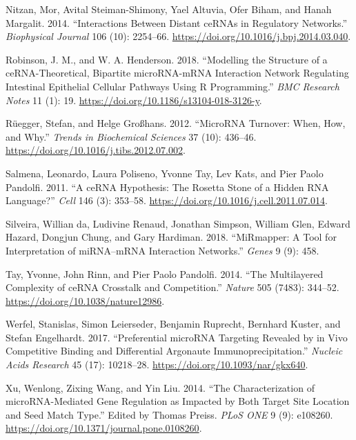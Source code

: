 \documentclass[]{article}
\begin{document}
\leavevmode\hypertarget{ref-nitzan_interactions_2014}{}%
Nitzan, Mor, Avital Steiman-Shimony, Yael Altuvia, Ofer Biham, and Hanah
Margalit. 2014. ``Interactions Between Distant ceRNAs in Regulatory
Networks.'' \emph{Biophysical Journal} 106 (10): 2254--66.
\url{https://doi.org/10.1016/j.bpj.2014.03.040}.

\leavevmode\hypertarget{ref-robinson_modelling_2018}{}%
Robinson, J. M., and W. A. Henderson. 2018. ``Modelling the Structure of
a ceRNA-Theoretical, Bipartite microRNA-mRNA Interaction Network
Regulating Intestinal Epithelial Cellular Pathways Using R
Programming.'' \emph{BMC Research Notes} 11 (1): 19.
\url{https://doi.org/10.1186/s13104-018-3126-y}.

\leavevmode\hypertarget{ref-ruegger_microrna_2012}{}%
Rüegger, Stefan, and Helge Großhans. 2012. ``MicroRNA Turnover: When,
How, and Why.'' \emph{Trends in Biochemical Sciences} 37 (10): 436--46.
\url{https://doi.org/10.1016/j.tibs.2012.07.002}.

\leavevmode\hypertarget{ref-salmena_cerna_2011}{}%
Salmena, Leonardo, Laura Poliseno, Yvonne Tay, Lev Kats, and Pier Paolo
Pandolfi. 2011. ``A ceRNA Hypothesis: The Rosetta Stone of a Hidden RNA
Language?'' \emph{Cell} 146 (3): 353--58.
\url{https://doi.org/10.1016/j.cell.2011.07.014}.

\leavevmode\hypertarget{ref-da2018mirmapper}{}%
Silveira, Willian da, Ludivine Renaud, Jonathan Simpson, William Glen,
Edward Hazard, Dongjun Chung, and Gary Hardiman. 2018. ``MiRmapper: A
Tool for Interpretation of miRNA--mRNA Interaction Networks.''
\emph{Genes} 9 (9): 458.

\leavevmode\hypertarget{ref-tay_multilayered_2014}{}%
Tay, Yvonne, John Rinn, and Pier Paolo Pandolfi. 2014. ``The
Multilayered Complexity of ceRNA Crosstalk and Competition.''
\emph{Nature} 505 (7483): 344--52.
\url{https://doi.org/10.1038/nature12986}.

\leavevmode\hypertarget{ref-werfel_preferential_2017}{}%
Werfel, Stanislas, Simon Leierseder, Benjamin Ruprecht, Bernhard Kuster,
and Stefan Engelhardt. 2017. ``Preferential microRNA Targeting Revealed
by in Vivo Competitive Binding and Differential Argonaute
Immunoprecipitation.'' \emph{Nucleic Acids Research} 45 (17): 10218--28.
\url{https://doi.org/10.1093/nar/gkx640}.

\leavevmode\hypertarget{ref-xu_characterization_2014}{}%
Xu, Wenlong, Zixing Wang, and Yin Liu. 2014. ``The Characterization of
microRNA-Mediated Gene Regulation as Impacted by Both Target Site
Location and Seed Match Type.'' Edited by Thomas Preiss. \emph{PLoS ONE}
9 (9): e108260. \url{https://doi.org/10.1371/journal.pone.0108260}.
\end{document}

